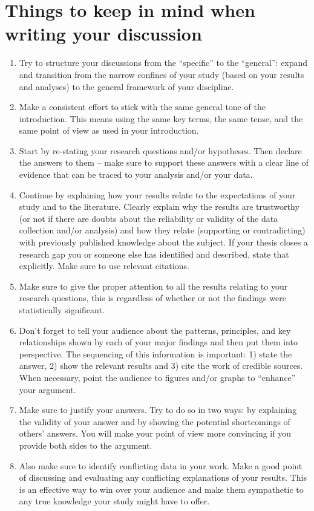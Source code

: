 \documentclass[a4paper,twoside]{bth}
\begin{document}
\section{Things to keep in mind when writing your discussion}
\begin{enumerate}
    \item Try to structure your discussions from the ``specific'' to the ``general'': expand and transition from the narrow confines of your study (based on your results and analyses) to the general framework of your discipline.
    \item Make a consistent effort to stick with the same general tone of the introduction. This means using the same key terms, the same tense, and the same point of view as used in your introduction.
    \item Start by re-stating your research questions and/or hypotheses. Then declare the answers to them -- make sure to support these answers with a clear line of evidence that can be traced to your analysis and/or your data.
    \item Continue by explaining how your results relate to the expectations of your study and to the literature. Clearly explain why the results are trustworthy (or not if there are doubts about the reliability or validity of the data collection and/or analysis) and how they relate (supporting or contradicting) with previously published knowledge about the subject. If your thesis closes a research gap you or someone else has identified and described, state that explicitly. Make sure to use relevant citations.
    \item Make sure to give the proper attention to all the results relating to your research questions, this is regardless of whether or not the findings were statistically significant.
    \item Don't forget to tell your audience about the patterns, principles, and key relationships shown by each of your major findings and then put them into perspective. The sequencing of this information is important: 1) state the answer, 2) show the relevant results and 3) cite the work of credible sources. When necessary, point the audience to figures and/or graphs to ``enhance'' your argument.
    \item Make sure to justify your answers. Try to do so in two ways: by explaining the validity of your answer and by showing the potential shortcomings of others' answers. You will make your point of view more convincing if you provide both sides to the argument.
    \item Also make sure to identify conflicting data in your work. Make a good point of discussing and evaluating any conflicting explanations of your results. This is an effective way to win over your audience and make them sympathetic to any true knowledge your study might have to offer.

\end{enumerate}
\end{document}

